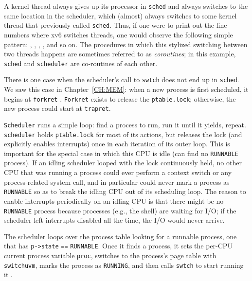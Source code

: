 A kernel thread always gives up its
processor in
\lstinline{sched} 
and always switches to the same location in the scheduler, which
(almost) always switches to some kernel thread that previously called
\lstinline{sched}. 
Thus, if one were to print out the line numbers where xv6 switches
threads, one would observe the following simple pattern:
,
,
,
,
and so on.  The procedures in which this stylized switching between
two threads happens are sometimes referred to as 
\textit{coroutines}; 
in this example,
\lstinline{sched}
and
\lstinline{scheduler}
are co-routines of each other.

There is one case when the scheduler's call to
\lstinline{swtch}
does not end up in
\lstinline{sched}.
We saw this case in Chapter~\ref{CH:MEM}: when a
new process is first scheduled, it begins at
\lstinline{forkret}
.
\lstinline{Forkret}
exists to release the 
\lstinline{ptable.lock};
otherwise, the new process could start at
\lstinline{trapret}.

\lstinline{Scheduler}
runs a simple loop:
find a process to run, run it until it yields, repeat.
\lstinline{scheduler}
holds
\lstinline{ptable.lock}
for most of its actions,
but releases the lock (and explicitly enables interrupts)
once in each iteration of its outer loop.
This is important for the special case in which this CPU
is idle (can find no
\lstinline{RUNNABLE}
process).
If an idling scheduler looped with
the lock continuously held, no other CPU that
was running a process could ever perform a context
switch or any process-related system call,
and in particular could never mark a process as
\lstinline{RUNNABLE}
so as to break the idling CPU out of its scheduling loop.
The reason to enable interrupts periodically on an idling
CPU is that there might be no
\lstinline{RUNNABLE}
process because processes (e.g., the shell) are
waiting for I/O;
if the scheduler left interrupts disabled all the time,
the I/O would never arrive.

The scheduler
loops over the process table
looking for a runnable process, one that has
\lstinline{p->state} 
\lstinline{==}
\lstinline{RUNNABLE}.
Once it finds a process, it sets the per-CPU current process
variable
\lstinline{proc},
switches to the process's page table with
\lstinline{switchuvm},
marks the process as
\lstinline{RUNNING},
and then calls
\lstinline{swtch}
to start running it
.

